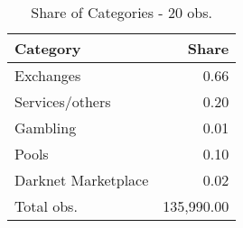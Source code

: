 \begin{table}[ht]
\centering
\begin{tabular}{lr}
  \hline
Category & Share \\ 
  \hline
Exchanges & 0.66 \\ 
  Services/others & 0.20 \\ 
  Gambling & 0.01 \\ 
  Pools & 0.10 \\ 
  Darknet Marketplace & 0.02 \\ 
  Total obs. & 135,990.00 \\ 
   \hline
\end{tabular}
\caption{Share of Categories - 20 obs.} 
\label{sh_cat_20obs}
\end{table}
